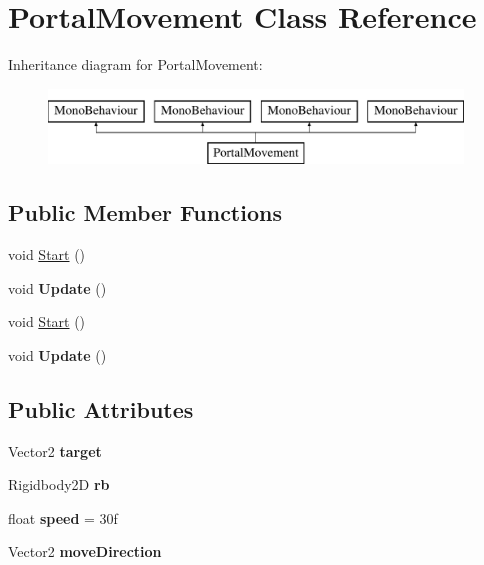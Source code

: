 \hypertarget{class_portal_movement}{}\section{Portal\+Movement Class Reference}
\label{class_portal_movement}
Inheritance diagram for Portal\+Movement\+:\begin{figure}[H]
\begin{center}
\leavevmode
\includegraphics[height=2.000000cm]{class_portal_movement}
\end{center}
\end{figure}
\subsection*{Public Member Functions}
\begin{DoxyCompactItemize}
\item 
void \mbox{\hyperlink{class_portal_movement_aa7beca3afea663ec0de74142ac852ca4}{Start}} ()
\item 
\mbox{\label{class_portal_movement_aeb23b9ab7c546f248da82c6e9b6dd473}} 
void {\bfseries Update} ()
\item 
void \mbox{\hyperlink{class_portal_movement_aa7beca3afea663ec0de74142ac852ca4}{Start}} ()
\item 
\mbox{\label{class_portal_movement_aeb23b9ab7c546f248da82c6e9b6dd473}} 
void {\bfseries Update} ()
\end{DoxyCompactItemize}
\subsection*{Public Attributes}
\begin{DoxyCompactItemize}
\item 
\mbox{\label{class_portal_movement_ad02d06d822cb837c2b6815bd0f448ca7}} 
Vector2 {\bfseries target}
\item 
\mbox{\label{class_portal_movement_a527ecae1396a95f37468482a7e717211}} 
Rigidbody2D {\bfseries rb}
\item 
\mbox{\label{class_portal_movement_a206e9a3b0b782c6fd112bf99ff6a7bf4}} 
float {\bfseries speed} = 30f
\item 
\mbox{\label{class_portal_movement_a80572fcf6a3158f6cc7fe64ed4d68f20}} 
Vector2 {\bfseries move\+Direction}
\end{DoxyCompactItemize}


